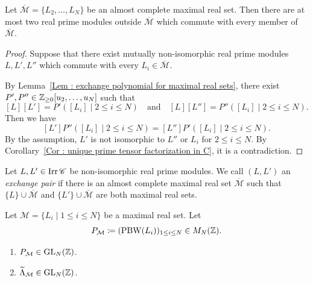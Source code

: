 \begin{Prop}
\label{Prop : at most two complements of an almost complete maximal real set}
Let $\overline{\mathcal M} = \{L_2, \ldots, L_N\}$ be an almost complete
maximal real set.
Then there are at most two real prime modules outside
$\overline{\mathcal M}$ which commute with every member of
$\overline{\mathcal M}$.
\end{Prop}

\begin{proof}
Suppose that there exist mutually non-isomorphic real prime modules
$L, L', L''$ which commute with every $L_i \in \overline{\mathcal M}$.

By Lemma~\ref{Lem : exchange polynomial for maximal real sets},
there exist $P', P'' \in \mathbb{Z}_{\geq 0}[u_2, \ldots, u_N]$ such that
\[
[L][L'] = P'([L_i] \mid 2 \leq i \leq N)
\quad\text{and}\quad
[L][L''] = P''([L_i] \mid 2 \leq i \leq N).
\]
Then we have
\[
[L']P''([L_i] \mid 2 \leq i \leq N)
= [L'']P'([L_i] \mid 2 \leq i \leq N).
\]
By the assumption, $L'$ is not isomorphic to $L''$ or $L_i$
for $2 \leq i \leq N$.
By Corollary~\ref{Cor : unique prime tensor factorization in C},
it is a contradiction.
\end{proof}

\begin{Def}
\label{Def : exchange pairs of maximal real sets}
Let $L, L' \in \mathop{\mathrm{Irr}}\nolimits\mathscr{C}$ be non-isomorphic real prime modules.
We call $(L, L')$ an \emph{exchange pair} if there is an almost complete
maximal real set $\overline{\mathcal M}$ such that
$\{L\} \cup \overline{\mathcal M}$ and
$\{L'\} \cup \overline{\mathcal M}$ are both maximal real sets.
\end{Def}

\begin{Lem}
\label{Lem : unimodularity of PBW and tilde Lambda matrices}
Let $\mathcal M = \{L_i \mid 1 \leq i \leq N\}$ be a maximal real set.
Let
\[
P_{\mathcal M} \coloneq
(\mathrm{PBW}(L_i))_{1 \leq i \leq N} \in M_N(\mathbb{Z}).
\]
\begin{enumerate}
\item[(i)] $P_{\mathcal M} \in \mathrm{GL}_N(\mathbb{Z})$.
\item[(ii)] $\widetilde{\Lambda}_{\mathcal M} \in \mathrm{GL}_N(\mathbb{Z})$.
\end{enumerate}
\end{Lem}

